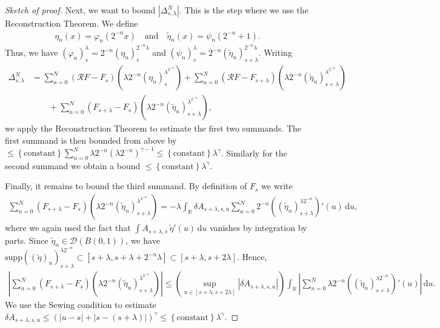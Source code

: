 \begin{proof}[Sketch of proof]
  Next, we want to bound \( |\Delta^N_{s,\lambda}| \). This is the step where we use the Reconstruction Theorem. We define 
  \begin{align*}
    \eta_n(x) = \varphi_n(2^{-n}x) \quad \text{and} \quad \tilde \eta_n(x) = \psi_n(2^{-n} + 1).
  \end{align*}
  Thus, we have \( (\varphi_n)^\lambda_s = 2^{-n} (\eta_n)_s^{2^{-n}\lambda} \) and \( (\psi_n)^\lambda_s = 2^{-n} (\tilde \eta_n)^{2^{-n}\lambda}_{s + \lambda}\). Writing 
  \begin{align*}
    \Delta^N_{s, \lambda} &= \sum^N_{n=0} (\mathcal{R}F - F_s)(\lambda 2^{-n}(\eta_n)_s^{\lambda^{2^{-n}}}) 
    + \sum^N_{n=0} (\mathcal{R}F - F_{s + \lambda})(\lambda 2^{-n}(\tilde \eta_n)_{s + \lambda}^{\lambda^{2^{-n}}}) \\
     &\qquad + \sum^N_{n=0} (F_{s + \lambda} - F_s)(\lambda 2^{-n}(\tilde \eta_n)_{s + \lambda}^{\lambda^{2^{-n}}}),
  \end{align*}
  we apply the Reconstruction Theorem to estimate the first two summands. The first summand is then bounded from above by \( \leq \left\{ \mathrm{constant} \right\} \sum^N_{n=0}\lambda2^{-n} (\lambda 2^{-n})^{\gamma - 1}  \leq \left\{ \mathrm{constant} \right\} \lambda^\gamma\). Similarly for the second summand we obtain a bound \( \leq \left\{ \mathrm{constant} \right\} \lambda^\gamma \). 

  Finally, it remains to bound the third summand. By definition of \( F_s \) we write 
  \begin{align*}
    \sum^N_{n=0} (F_{s + \lambda} - F_s)(\lambda 2^{-n}(\tilde \eta_n)_{s + \lambda}^{\lambda^{2^{-n}}}) = -\lambda \int_{\mathbb{R}} \delta A_{s + \lambda,s , u} \sum^N_{n=0}2^{-n}\left( (\tilde \eta_n)^{\lambda 2^{-n}}_{s + \lambda} \right)' (u) \, \mathrm{d}u,
  \end{align*}
  where we again used the fact that \( \int A_{s + \lambda, s} \, \tilde \eta'(u) \, \mathrm{d}u \) vanishes by integration by parts. Since \( \tilde \eta_n \in \mathcal{D}(B(0,1)) \), we have \( \mathrm{supp}((\tilde \eta)_n)_{s + \lambda}^{\lambda 2^{-n}} \subset [s + \lambda, s + \lambda + 2^{-n}\lambda] \subset [s + \lambda, s + 2\lambda]\). Hence, 
  \begin{align*}
    |\sum^N_{n=0} (F_{s + \lambda} - F_s)(\lambda 2^{-n}(\tilde \eta_n)_{s + \lambda}^{\lambda^{2^{-n}}})| \leq \left( \sup_{u \in [s + \lambda, s + 2\lambda]} |\delta A_{s + \lambda, s, u} | \right) \int_{\mathbb{R}} |\sum^N_{n=0} \lambda 2^{-n} ((\tilde \eta_n)_{s + \lambda}^{\lambda 2^{-n}})'(u)| \, \mathrm{d}u.
  \end{align*}
  We use the Sewing condition to estimate \( \delta A_{s + \lambda, s, u} \leq (|u-s| + |s - (s + \lambda)|)^\gamma \leq \left\{ \mathrm{constant}  \right\} \lambda^\gamma \).


\end{proof}

